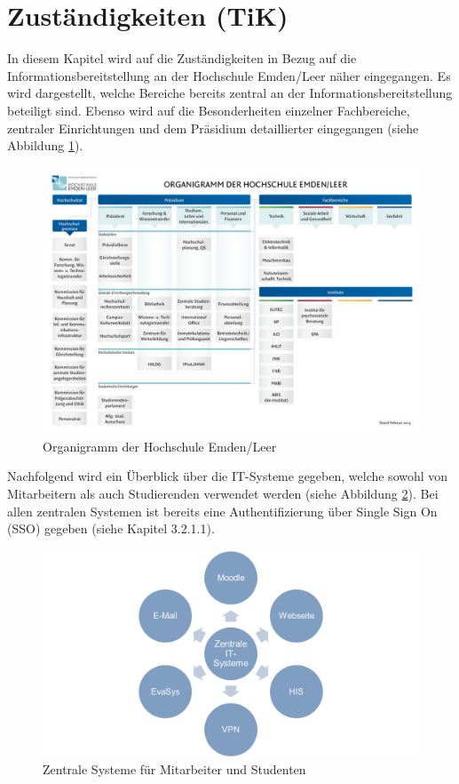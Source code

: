 \section{Zuständigkeiten (TiK)}
\label{section_zustaendigkeiten}
In diesem Kapitel wird auf die Zuständigkeiten in Bezug auf die Informationsbereitstellung an der Hochschule Emden/Leer näher eingegangen. Es wird dargestellt, welche Bereiche bereits zentral an der Informationsbereitstellung beteiligt sind. Ebenso wird auf die Besonderheiten einzelner Fachbereiche, zentraler Einrichtungen und dem Präsidium detaillierter eingegangen (siehe Abbildung \ref{fig_organigramm_HS}). 

\begin{figure}[h!]
	\centering
	\includegraphics[width=14cm]{kapitel/gruppe2/bilder/organigramm_HS}
	\caption{Organigramm der Hochschule Emden/Leer}
	\label{fig_organigramm_HS}
\end{figure}

Nachfolgend wird ein Überblick über die IT-Systeme gegeben, welche sowohl von Mitarbeitern als auch Studierenden verwendet werden (siehe Abbildung  \ref{fig_zentrale_systeme}). Bei allen zentralen Systemen ist bereits eine Authentifizierung über Single Sign On (SSO) gegeben (siehe Kapitel 3.2.1.1).

\begin{figure}[h!]
	\centering
	\includegraphics[width=14cm]{kapitel/gruppe2/bilder/zentrale_systeme}
	\caption{Zentrale Systeme für Mitarbeiter und Studenten}
	\label{fig_zentrale_systeme}
\end{figure}


